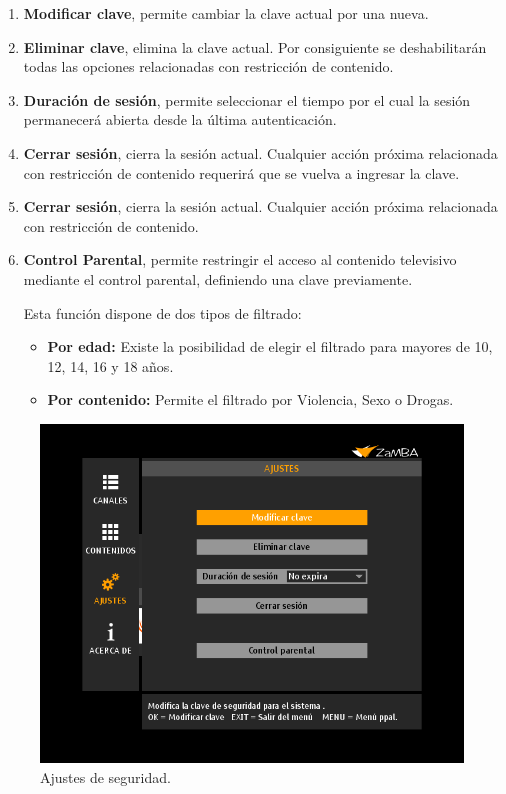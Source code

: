 \documentclass{article}
\begin{document}
	\begin{enumerate}[label*=\arabic*.]
	\item \textbf{Modificar clave}, permite cambiar la clave actual por una nueva.
	\item \textbf{Eliminar clave}, elimina la clave actual. Por consiguiente se deshabilitarán todas las opciones relacionadas con restricción de contenido.
	\item \textbf{Duración de sesión}, permite seleccionar el tiempo por el cual la sesión permanecerá abierta desde la última autenticación.
	\item \textbf{Cerrar sesión}, cierra la sesión actual. Cualquier acción próxima relacionada con restricción de contenido requerirá que se vuelva a ingresar la clave.
	\item \textbf{Cerrar sesión}, cierra la sesión actual. Cualquier acción próxima relacionada con restricción de contenido.
	\item \textbf{Control Parental}, permite restringir el acceso al contenido televisivo mediante el control parental, definiendo una clave previamente.
	
Esta función dispone de dos tipos de filtrado:
	\begin{itemize}
	\item \textbf{Por edad:} Existe la posibilidad de elegir el filtrado para mayores de 10, 12, 14, 16 y 18 años.
	\item \textbf{Por contenido:} Permite el filtrado por Violencia, Sexo o Drogas.
	\end{itemize}
	
	\end{enumerate}
	
	\begin{figure}[h]
		\centerline{\includegraphics[scale=0.50,keepaspectratio=true]{ajustes_seguridad}}
		\caption{Ajustes de seguridad.}
	\end{figure}
\end{document}
